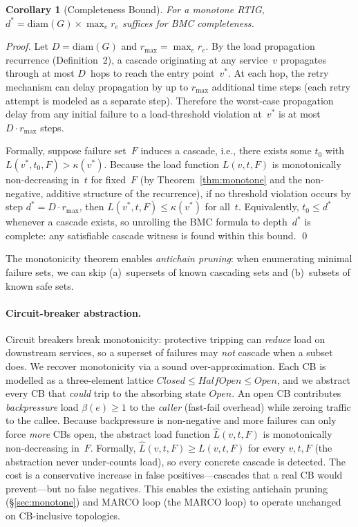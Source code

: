 \documentclass[10pt,twocolumn]{article}
\newcommand{\rtig}{RTIG\xspace}
\newtheorem{corollary}[theorem]{Corollary}
\begin{document}
\begin{corollary}[Completeness Bound]
\label{cor:bound}
For a monotone \rtig, $d^* = \mathrm{diam}(G) \times \max_e r_e$ suffices
for BMC completeness.
\end{corollary}

\begin{proof}
Let $D = \mathrm{diam}(G)$ and $r_{\max} = \max_e r_e$.
By the load propagation recurrence (Definition~2), a cascade originating at
any service~$v$ propagates through at most $D$~hops to reach the entry
point~$v^*$. At each hop, the retry mechanism can delay propagation by up to
$r_{\max}$ additional time steps (each retry attempt is modeled as a separate
step). Therefore the worst-case propagation delay from any initial failure to
a load-threshold violation at~$v^*$ is at most $D \cdot r_{\max}$ steps.

Formally, suppose failure set~$F$ induces a cascade, i.e., there exists some
$t_0$ with $L(v^*, t_0, F) > \kappa(v^*)$.  Because the load function
$L(v, t, F)$ is monotonically non-decreasing in~$t$ for fixed~$F$ (by
Theorem~\ref{thm:monotone} and the non-negative, additive structure of the
recurrence), if no threshold violation occurs by step $d^* = D \cdot r_{\max}$,
then $L(v^*, t, F) \le \kappa(v^*)$ for all~$t$.  Equivalently,
$t_0 \le d^*$ whenever a cascade exists, so unrolling the BMC formula to
depth~$d^*$ is complete: any satisfiable cascade witness is found within this
bound. \qed
\end{proof}

The monotonicity theorem enables \emph{antichain pruning}: when enumerating
minimal failure sets, we can skip (a)~supersets of known cascading sets and
(b)~subsets of known safe sets.

\paragraph{Circuit-breaker abstraction.}
Circuit breakers break monotonicity: protective tripping can \emph{reduce}
load on downstream services, so a superset of failures may \emph{not} cascade
when a subset does.  We recover monotonicity via a sound over-approximation.
Each CB is modelled as a three-element lattice
$\mathit{Closed} \le \mathit{HalfOpen} \le \mathit{Open}$, and we
abstract every CB that \emph{could} trip to the absorbing state
$\mathit{Open}$.  An open CB contributes \emph{backpressure} load
$\beta(e) \ge 1$ to the \emph{caller} (fast-fail overhead) while zeroing
traffic to the callee.  Because backpressure is non-negative and more
failures can only force \emph{more} CBs open, the abstract load function
$\hat{L}(v, t, F)$ is monotonically non-decreasing in~$F$.
Formally, $\hat{L}(v,t,F) \ge L(v,t,F)$ for every $v,t,F$ (the abstraction
never under-counts load), so every concrete cascade is detected.
The cost is a conservative increase in false positives---cascades that a
real CB would prevent---but no false negatives.  This enables the existing
antichain pruning (\S\ref{sec:monotone}) and MARCO loop
(the MARCO loop) to operate unchanged on CB-inclusive topologies.
\end{document}
